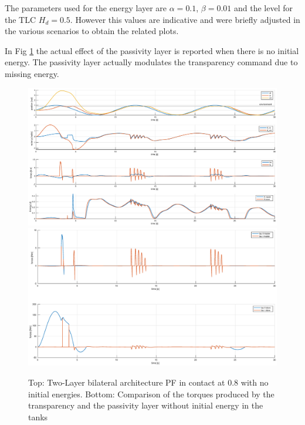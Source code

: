 \documentclass[a4paper,12pt]{article}
\begin{document}
The parameters used for the energy layer are $\alpha = 0.1$, $\beta = 0.01$ and the level for the TLC $H_d = 0.5$. However this values are indicative and were briefly adjusted in the various scenarios to obtain the related plots.
\bigskip

In Fig \ref{fig:energy_pf_no_energy} the actual effect of the passivity layer is reported when there is no initial energy. The passivity layer actually modulates the transparency command due to missing energy.

\begin{figure}[H]
    \hspace*{-4.5cm}
    \includegraphics[scale=0.5]{images/energy_pf_no_energy.eps}
    \qquad
    \hspace*{-1.5cm}
    \includegraphics[scale=0.4]{images/energy_pf_tau.eps}
    \caption{Top: Two-Layer bilateral architecture PF in contact at 0.8 with no initial energies. Bottom: Comparison of the torques produced by the transparency and the passivity layer without initial energy in the tanks}
    \label{fig:energy_pf_no_energy}
\end{figure}
\end{document}
